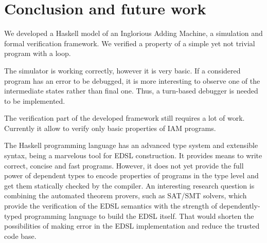 \section{Conclusion and future work}

We developed a Haskell model of an Inglorious Adding Machine, a simulation and formal verification framework. We verified a property of a simple yet not trivial program with a loop.

The simulator is working correctly, however it is very basic. If a considered program has an error to be
debugged, it is more interesting to observe one of the intermediate states rather than final one.
Thus, a turn-based debugger is needed to be implemented.

The verification part of the developed framework still requires a lot of work. Currently it allow to verify
only basic properties of IAM programs.

The Haskell programming language has an advanced type system and extensible syntax, being a marvelous tool for EDSL construction. It provides means to write correct, concise and fast programs. However, it does not yet provide the full power of dependent types to encode properties of programs in the type level and get them statically checked by the compiler. An interesting research question is combining the automated theorem provers, such as SAT/SMT solvers, which provide the verification of the EDSL semantics with the strength of dependently-typed programming language to build the EDSL itself. That would shorten the possibilities of making error in the EDSL implementation and reduce the trusted code base.